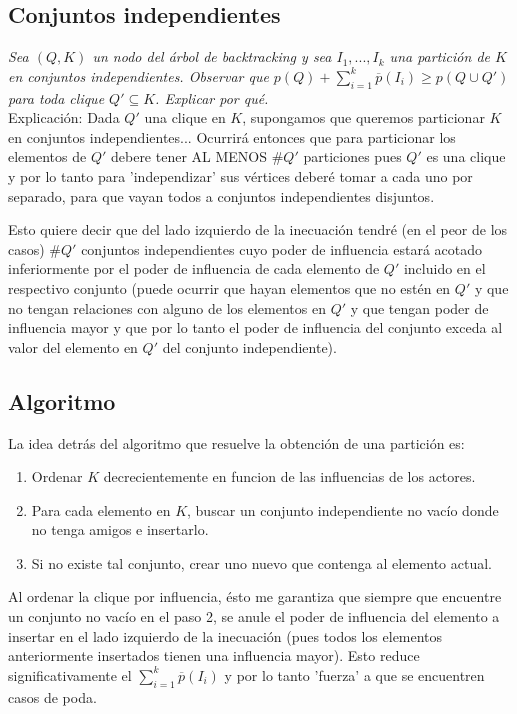 \documentclass[10pt, a4paper]{article}
\begin{document}
\subsection{Conjuntos independientes}
\emph{Sea $(Q, K)$ un nodo del \'arbol de backtracking y sea
$I_1 , . . . , I_k$ una partición de $K$ en conjuntos independientes. Observar que $p(Q) + \sum_{i=1}^{k} \overline{p}(I_i) \geq p(Q \cup Q')$ para toda clique $Q' \subseteq K$. Explicar por qu\'e.}\\

Explicaci\'on: Dada $Q'$ una clique en $K$, supongamos que queremos particionar $K$ en conjuntos independientes... Ocurrir\'a entonces que para particionar los elementos de $Q'$ debere tener AL MENOS $\#Q'$ particiones pues $Q'$ es una clique y por lo tanto para 'independizar' sus v\'ertices deber\'e tomar a cada uno por separado, para que vayan todos a conjuntos independientes disjuntos.

Esto quiere decir que del lado izquierdo de la inecuaci\'on tendr\'e (en el peor de los casos) $\#Q'$ conjuntos independientes cuyo poder de influencia estar\'a acotado inferiormente por el poder de influencia de cada elemento de $Q'$ incluido en el respectivo conjunto (puede ocurrir que hayan elementos que no est\'en en $Q'$ y que no tengan relaciones con alguno de los elementos en $Q'$ y que tengan poder de influencia mayor y que por lo tanto el poder de influencia del conjunto exceda al valor del elemento en $Q'$ del conjunto independiente).

\subsection{Algoritmo}
La idea detr\'as del algoritmo que resuelve la obtenci\'on de una partici\'on es:
\begin{enumerate}
    \item Ordenar $K$ decrecientemente en funcion de las influencias de los actores.
    \item Para cada elemento en $K$, buscar un conjunto independiente no vac\'io donde no tenga amigos e insertarlo.
    \item Si no existe tal conjunto, crear uno nuevo que contenga al elemento actual.
\end{enumerate}

Al ordenar la clique por influencia, \'esto me garantiza que siempre que encuentre un conjunto no vac\'io en el paso 2, se anule el poder de influencia del elemento a insertar en el lado izquierdo de la inecuaci\'on (pues todos los elementos anteriormente insertados tienen una influencia mayor). Esto reduce significativamente el $\sum_{i=1}^{k} \overline{p}(I_i)$ y por lo tanto 'fuerza' a que se encuentren casos de poda.
\end{document}
